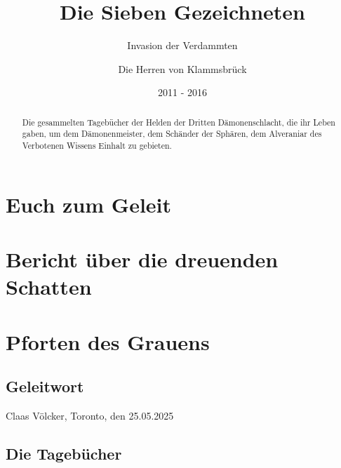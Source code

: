 \documentclass[11pt]{scrreprt}
\title{Die Sieben Gezeichneten}
\subtitle{Invasion der Verdammten}
\author{Die Herren von Klammsbrück}
\date{2011 - 2016}
\begin{document}
\maketitle

\begin{abstract}
Die gesammelten Tagebücher der Helden der Dritten Dämonenschlacht, die ihr Leben gaben, um dem Dämonenmeister, dem Schänder der Sphären, dem Alveraniar des Verbotenen Wissens Einhalt zu gebieten.
\end{abstract}

\chapter{Euch zum Geleit}

\chapter{Bericht über die dreuenden Schatten}

\chapter{Pforten des Grauens}

\section{Geleitwort}


\begin{flushright}
Claas Völcker, Toronto, den 25.05.2025
\end{flushright}


\section{Die Tagebücher}
\end{document}
